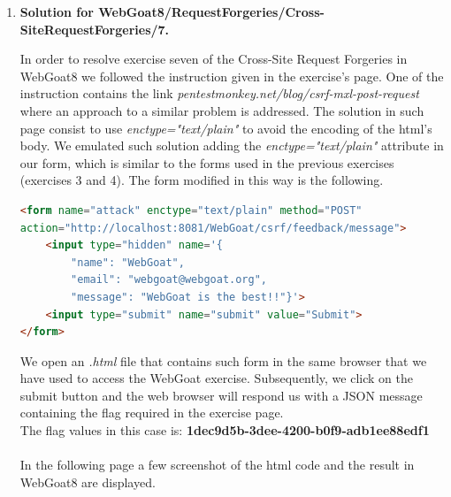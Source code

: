 \documentclass[11pt]{article}
\begin{document}
\begin{enumerate}

\item
\textbf{Solution for WebGoat8/RequestForgeries/Cross-SiteRequestForgeries/7.}

In order to resolve exercise seven of the Cross-Site Request Forgeries in WebGoat8 we followed the instruction given in the exercise's page. One of the instruction contains the link \textit{pentestmonkey.net/blog/csrf-mxl-post-request} where an approach to a similar problem is addressed. The solution in such page consist to use \textit{enctype="text/plain"} to avoid the encoding of the html's body. 
We emulated such solution adding the \textit{enctype="text/plain"} attribute in our form, which is similar to the forms used in the previous exercises (exercises 3 and 4). 
The form modified in this way is the following.
\begin{lstlisting}[language=html]
<form name="attack" enctype="text/plain" method="POST"
action="http://localhost:8081/WebGoat/csrf/feedback/message">
	<input type="hidden" name='{
		"name": "WebGoat", 
		"email": "webgoat@webgoat.org", 
		"message": "WebGoat is the best!!"}'>
	<input type="submit" name="submit" value="Submit">
</form>
\end{lstlisting}
We open an \textit{.html} file that contains such form in the same browser that we have used to access the WebGoat exercise. 
Subsequently, we click on the submit button and the web browser will respond us with a JSON message containing the flag required in the exercise page.\\
The flag values in this case is: \textbf{1dec9d5b-3dee-4200-b0f9-adb1ee88edf1}\\
\\

In the following page a few screenshot of the html code and the result in WebGoat8 are displayed.



\end{enumerate}
\end{document}
